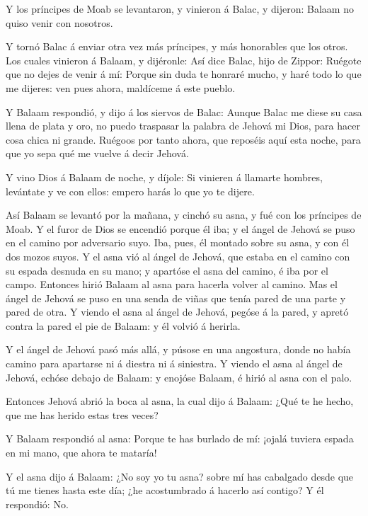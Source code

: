  Y los príncipes de Moab se levantaron, y vinieron á Balac,
y dijeron: Balaam no quiso venir con nosotros.

 Y tornó Balac á enviar otra vez más príncipes, y más
honorables que los otros.  Los cuales vinieron á Balaam, y
dijéronle: Así dice Balac, hijo de Zippor: Ruégote que no dejes de venir
á mí:  Porque sin duda te honraré mucho, y haré todo lo que
me dijeres: ven pues ahora, maldíceme á este pueblo.

 Y Balaam respondió, y dijo á los siervos de Balac: Aunque
Balac me diese su casa llena de plata y oro, no puedo traspasar la
palabra de Jehová mi Dios, para hacer cosa chica ni grande.
 Ruégoos por tanto ahora, que reposéis aquí esta noche,
para que yo sepa qué me vuelve á decir Jehová.

 Y vino Dios á Balaam de noche, y díjole: Si vinieren á
llamarte hombres, levántate y ve con ellos: empero harás lo que yo te
dijere.

 Así Balaam se levantó por la mañana, y cinchó su asna, y
fué con los príncipes de Moab.  Y el furor de Dios se
encendió porque él iba; y el ángel de Jehová se puso en el camino por
adversario suyo. Iba, pues, él montado sobre su asna, y con él dos mozos
suyos.  Y el asna vió al ángel de Jehová, que estaba en el
camino con su espada desnuda en su mano; y apartóse el asna del camino,
é iba por el campo. Entonces hirió Balaam al asna para hacerla volver al
camino.  Mas el ángel de Jehová se puso en una senda de
viñas que tenía pared de una parte y pared de otra.  Y
viendo el asna al ángel de Jehová, pegóse á la pared, y apretó contra la
pared el pie de Balaam: y él volvió á herirla.

 Y el ángel de Jehová pasó más allá, y púsose en una
angostura, donde no había camino para apartarse ni á diestra ni á
siniestra.  Y viendo el asna al ángel de Jehová, echóse
debajo de Balaam: y enojóse Balaam, é hirió al asna con el palo.

 Entonces Jehová abrió la boca al asna, la cual dijo á
Balaam: ¿Qué te he hecho, que me has herido estas tres veces?

 Y Balaam respondió al asna: Porque te has burlado de mí:
¡ojalá tuviera espada en mi mano, que ahora te mataría!

 Y el asna dijo á Balaam: ¿No soy yo tu asna? sobre mí has
cabalgado desde que tú me tienes hasta este día; ¿he acostumbrado á
hacerlo así contigo? Y él respondió: No.~

